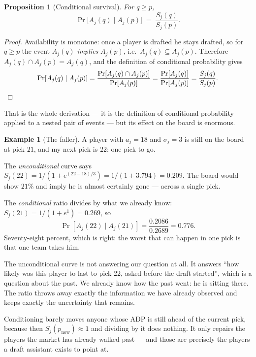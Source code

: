 \documentclass[10pt,a4paper]{article}
\theoremstyle{plain}
\newtheorem{proposition}[theorem]{Proposition}
\theoremstyle{definition}
\newtheorem{example}[theorem]{Example}
\theoremstyle{remark}
\begin{document}
\begin{proposition}[Conditional survival]
\label{prop:conditional}
For $q \ge p$,
\begin{equation}
\Pr\big[A_j(q) \mid A_j(p)\big] \;=\; \frac{S_j(q)}{S_j(p)}.
\label{eq:psurvive}
\end{equation}
\end{proposition}

\begin{proof}
Availability is monotone: once a player is drafted he stays drafted, so for $q \ge p$
the event $A_j(q)$ \emph{implies} $A_j(p)$, i.e.\ $A_j(q) \subseteq A_j(p)$. Therefore
$A_j(q) \cap A_j(p) = A_j(q)$, and the definition of conditional probability gives
\[
\Pr[A_j(q) \mid A_j(p)] = \frac{\Pr[A_j(q) \cap A_j(p)]}{\Pr[A_j(p)]}
 = \frac{\Pr[A_j(q)]}{\Pr[A_j(p)]} = \frac{S_j(q)}{S_j(p)}. \qedhere
\]
\end{proof}

That is the whole derivation --- it is the definition of conditional probability
applied to a nested pair of events --- but its effect on the board is enormous.

\begin{example}[The faller]
A player with $a_j = 18$ and $\sigma_j = 3$ is still on the board at pick $21$, and my
next pick is $22$: one pick to go.

The \emph{unconditional} curve says
$S_j(22) = 1/\!\left(1+e^{(22-18)/3}\right) = 1/(1+3.794) = 0.209$. The board would show
$21\%$ and imply he is almost certainly gone --- across a single pick.

The \emph{conditional} ratio divides by what we already know:
$S_j(21) = 1/(1+e^{1}) = 0.269$, so
\[
\Pr[A_j(22)\mid A_j(21)] = \frac{0.2086}{0.2689} = 0.776 .
\]
Seventy-eight percent, which is right: the worst that can happen in one pick is that one
team takes him.
\end{example}

The unconditional curve is not answering our question at all. It answers ``how likely
was this player to last to pick 22, asked before the draft started'', which is a
question about the past. We already know how the past went: he is sitting there. The
ratio throws away exactly the information we have already observed and keeps exactly
the uncertainty that remains.

Conditioning barely moves anyone whose ADP is still ahead of the current pick, because
then $S_j(p_{\text{now}}) \approx 1$ and dividing by it does nothing. It only repairs
the players the market has already walked past --- and those are precisely the players
a draft assistant exists to point at.
\end{document}
